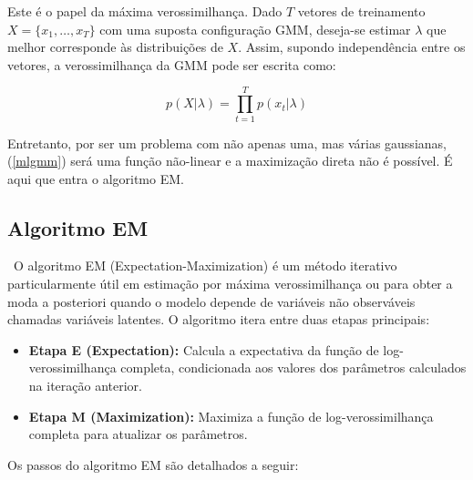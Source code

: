 \documentclass[12pt]{article}
\begin{document}
Este é o papel da máxima verossimilhança. Dado $T$ vetores de treinamento $X = \{x_1, \ldots, x_T\}$ com uma suposta configuração GMM, deseja-se estimar $\lambda$ que melhor corresponde às distribuições de $X$. Assim, supondo independência entre os vetores, a verossimilhança da GMM pode ser escrita como:

\begin{equation} \label{mlgmm}
p(X|\lambda) = \prod_{t=1}^{T} p(x_t|\lambda)
\end{equation}

Entretanto, por ser um problema com não apenas uma, mas várias gaussianas, (\ref{mlgmm}) será uma função não-linear e a maximização direta não é possível. É aqui que entra o algoritmo EM.


\subsection{Algoritmo EM}
\
O algoritmo EM (Expectation-Maximization) é um método iterativo particularmente útil em estimação por máxima verossimilhança ou para obter a moda a posteriori quando o modelo depende de variáveis não observáveis chamadas variáveis latentes. O algoritmo itera entre duas etapas principais:

\begin{itemize}
    \item \textbf{Etapa E (Expectation):} Calcula a expectativa da função de log-verossimilhança completa, condicionada aos valores dos parâmetros calculados na iteração anterior.
    \item \textbf{Etapa M (Maximization):} Maximiza a função de log-verossimilhança completa para atualizar os parâmetros.
\end{itemize}

Os passos do algoritmo EM são detalhados a seguir:
\end{document}
